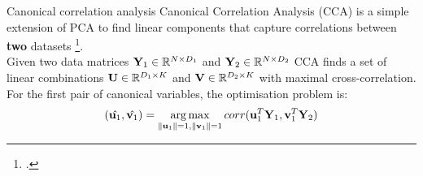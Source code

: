 \documentclass[aspectratio=169,notes]{beamer}
\begin{document}
	\begin{frame}{Canonical correlation analysis}
	Canonical Correlation Analysis (CCA) is a simple extension of PCA to find linear components that capture correlations between \textbf{two} datasets \footcite{Hotteling1936}.\\
	\leavevmode\newline
	Given two data matrices ${\bf Y}_1 \in \mathbb{R}^{N \times D_1}$ and ${\bf Y}_2 \in \mathbb{R}^{N \times D_2}$ CCA finds a set of linear combinations ${\bf U} \in \mathbb{R}^{D_1 \times K}$ and ${\bf V} \in \mathbb{R}^{D_2 \times K}$ with maximal cross-correlation.\\ 
	\leavevmode\newline
	For the first pair of canonical variables, the optimisation problem is:
	\[
		(\hat{{\bf u}_1}, \hat{{\bf v}_1}) = \operatorname*{arg\,max}_{\|{\bf u}_1\|=1,\|{\bf v}_1\|=1} corr({\bf u}_{1}^T {\bf Y}_1, {\bf v}_{1}^T {\bf Y}_2)
	\]
	\end{frame}

\end{document}
